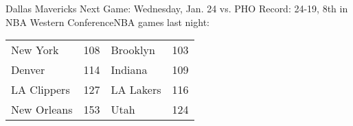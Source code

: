Dallas Mavericks
Next Game: Wednesday, Jan. 24 vs. PHO
Record: 24-19, 8th in NBA Western ConferenceNBA games last night:
\begin{tabular}{llll}
\toprule
   New York & 108 &  Brooklyn & 103 \\
     Denver & 114 &   Indiana & 109 \\
LA Clippers & 127 & LA Lakers & 116 \\
New Orleans & 153 &      Utah & 124 \\
\bottomrule
\end{tabular}

